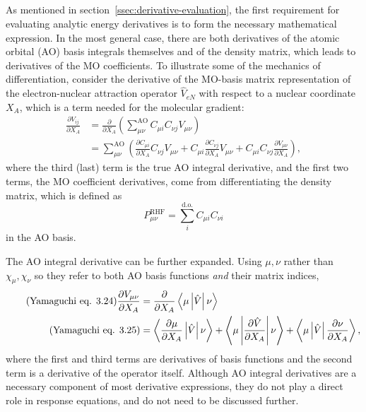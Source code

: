 \documentclass[%
class = book,%
crop = false,%
float = true,%
multi = true,%
preview = false,%
]{standalone}
\begin{document}
\subsection{\texorpdfstring{\href{https://chemistry.stackexchange.com/q/89831/194}{\color{black}{Analytic derivative theory}}}{Analytic derivative theory}}
\label{ssec:analytic-derivative-theory}

As mentioned in section~\ref{ssec:derivative-evaluation}, the first requirement for evaluating analytic energy derivatives is to form the necessary mathematical expression. In the most general case, there are both derivatives of the atomic orbital (AO) basis integrals themselves and of the density matrix, which leads to derivatives of the MO coefficients. To illustrate some of the mechanics of differentiation, consider the derivative of the MO-basis matrix representation of the electron-nuclear attraction operator \(\hat{V}_{eN}\) with respect to a nuclear coordinate \(X_{A}\), which is a term needed for the molecular gradient:
\begin{align}
  \label{eq:yamaguchi-3.80}\tag{Yamaguchi eq. 3.80}
  \frac{\partial V_{ij}}{\partial X_{A}} &= \frac{\partial}{\partial X_{A}} \left( \sum_{\mu\nu}^{\text{AO}} C_{\mu i} C_{\nu j} V_{\mu\nu} \right) \\
  \label{3.81}\tag{Yamaguchi eq. 3.81}
                                         &= \sum_{\mu\nu}^{\text{AO}} \left( \frac{\partial C_{\mu i}}{\partial X_{A}} C_{\nu j} V_{\mu\nu} + C_{\mu i} \frac{\partial C_{\nu j}}{\partial X_{A}} V_{\mu\nu} + C_{\mu i} C_{\nu j} \frac{\partial V_{\mu\nu}}{\partial X_{A}} \right),
\end{align}
where the third (last) term is the true AO integral derivative, and the first two terms, the MO coefficient derivatives, come from differentiating the density matrix, which is defined as
\begin{equation}
  \label{eq:density-matrix}
  P_{\mu\nu}^{\text{RHF}} = \sum_{i}^{\text{d.o.}} C_{\mu i} C_{\nu i}
\end{equation}
in the AO basis.

The AO integral derivative can be further expanded. Using \(\mu,\nu\) rather than \(\chi_{\mu},\chi_{\nu}\) so they refer to both AO basis functions \emph{and} their matrix indices,
\begin{align}
  \tag{Yamaguchi eq. 3.24}
  \frac{\partial V_{\mu\nu}}{\partial X_{A}} &= \frac{\partial}{\partial X_{A}} \Braket{ \mu \left| \hat{V} \right| \nu } \\
  \label{3.25}\tag{Yamaguchi eq. 3.25}
                                             &= \Braket{ \frac{\partial \mu}{\partial X_{A}} \left| \hat{V} \right| \nu } + \Braket{ \mu \left| \frac{\partial \hat{V}}{\partial X_{A}} \right| \nu } + \Braket{ \mu \left| \hat{V} \right| \frac{\partial \nu}{\partial X_{A}} },
\end{align}
where the first and third terms are derivatives of basis functions and the second term is a derivative of the operator itself. Although AO integral derivatives are a necessary component of most derivative expressions, they do not play a direct role in response equations, and do not need to be discussed further.
\end{document}
